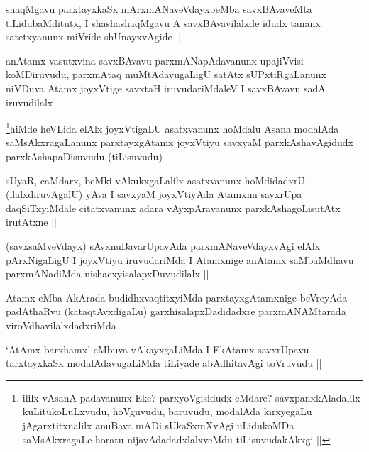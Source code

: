 \begin{artha}
shaqMgavu parxtayxkaSx mArxmANaveVdayxbeMba savxBAvaveMta tiLidubaMditutx, I shashashaqMgavu A savxBAvavilalxde idudx tananx satetxyanunx miVride shUnayxvAgide ||
\end{artha}

\begin{artha}
anAtamx vasutxvina savxBAvavu parxmANapAdavanunx upajiVvisi koMDiruvudu, parxmAtaq muMtAdavugaLigU satAtx sUPxtiRgaLanunx niVDuva Atamx joyxVtige savxtaH iruvudariMdaleV I savxBAvavu sadA iruvudilalx ||
\end{artha}

\begin{artha}
\footnote[1]{ililx vAsanA padavanunx Eke? parxyoVgisidudx eMdare? savxpanxkAladalilx kuLitukoLuLxvudu, hoVguvudu, baruvudu, modalAda kirxyegaLu jAgarxtitxnalilx anuBava mADi sUkaSxmXvAgi uLidukoMDa saMsAkxragaLe horatu nijavAdadadxlalxveMdu tiLisuvudakAkxgi ||}hiMde heVLida elAlx joyxVtigaLU asatxvanunx hoMdalu Asana modalAda saMsAkxragaLanunx parxtayxgAtamx joyxVtiyu savxyaM parxkAshavAgidudx parxkAshapaDisuvudu (tiLisuvudu) ||
\end{artha}

\begin{artha}
sUyaR, caMdarx, beMki vAkukxgaLalilx asatxvanunx hoMdidadxrU (ilalxdiruvAgalU) yAva I savxyaM joyxVtiyAda Atamxnu savxrUpa daqSiTxyiMdale citatxvanunx adara vAyxpAravanunx parxkAshagoLisutAtx irutAtxne ||
\end{artha}

\begin{artha}
(savxsaMveVdayx) sAvxnuBavarUpavAda parxmANaveVdayxvAgi elAlx pArxNigaLigU I joyxVtiyu iruvudariMda I Atamxnige anAtamx saMbaMdhavu parxmANadiMda nishacxyisalapxDuvudilalx ||
\end{artha}

\begin{artha}
Atamx eMba AkArada budidhxvaqtitxyiMda parxtayxgAtamxnige beVreyAda padAthaRvu (kataqtAvxdigaLu) garxhisalapxDadidadxre parxmANAMtarada viroVdhavilalxdadxriMda 
\end{artha}

\begin{artha}
`AtAmx barxhamx' eMbuva vAkayxgaLiMda I EkAtamx savxrUpavu tarxtayxkaSx modalAdavugaLiMda tiLiyade abAdhitavAgi toVruvudu ||             
\end{artha}

